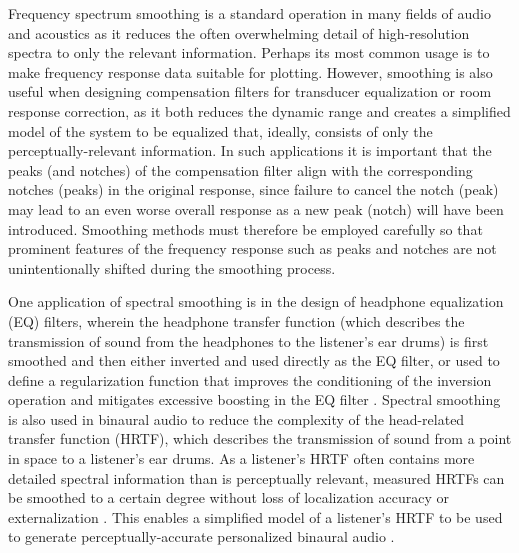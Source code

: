 Frequency spectrum smoothing is a standard operation in many fields of audio and acoustics as it reduces the often overwhelming detail of high-resolution spectra to only the relevant information.
Perhaps its most common usage is to make frequency response data suitable for plotting.
However, smoothing is also useful when designing compensation filters for transducer equalization or room response correction, as it both reduces the dynamic range and creates a simplified model of the system to be equalized that, ideally, consists of only the perceptually-relevant information.
In such applications it is important that the peaks (and notches) of the compensation filter align with the corresponding notches (peaks) in the original response, since failure to cancel the notch (peak) may lead to an even worse overall response as a new peak (notch) will have been introduced.
Smoothing methods must therefore be employed carefully so that prominent features of the frequency response such as peaks and notches are not unintentionally shifted during the smoothing process.

One application of spectral smoothing is in the design of headphone equalization (EQ) filters, wherein the headphone transfer function (which describes the transmission of sound from the headphones to the listener's ear drums) is first smoothed and then either inverted and used directly as the EQ filter, or used to define a regularization function that improves the conditioning of the inversion operation and mitigates excessive boosting in the EQ filter \citep{ScharerLindau2009}.
Spectral smoothing is also used in binaural audio to reduce the complexity of the head-related transfer function (HRTF), which describes the transmission of sound from a point in space to a listener's ear drums.
As a listener's HRTF often contains more detailed spectral information than is perceptually relevant, measured HRTFs can be smoothed to a certain degree without loss of localization accuracy or externalization \citep{XieZhang2010, Hassager2014}.
This enables a simplified model of a listener's HRTF to be used to generate perceptually-accurate personalized binaural audio \citep{Rasumow2014}.


